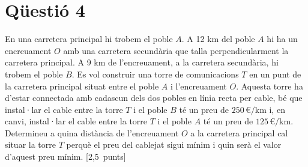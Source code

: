 \documentclass[11pt,a4paper]{article}
\begin{document}
\section*{\textcolor{blauPista}{Qüestió 4}}

\noindent En una carretera principal hi trobem el poble $A$. A 12 km del poble $A$ hi ha un encreuament $O$ amb una carretera secundària que talla perpendicularment la carretera principal. A 9 km de l'encreuament, a la carretera secundària, hi trobem el poble $B$. Es vol construir una torre de comunicacions $T$ en un punt de la carretera principal situat entre el poble $A$ i l'encreuament $O$. Aquesta torre ha d'estar connectada amb cadascun dels dos pobles en línia recta per cable, bé que instal·lar el cable entre la torre $T$ i el poble $B$ té un preu de $250\,\euro/\text{km}$ i, en canvi, instal·lar el cable entre la torre $T$ i el poble $A$ té un preu de $125\,\euro/\text{km}$. Determineu a quina distància de l'encreuament $O$ a la carretera principal cal situar la torre $T$ perquè el preu del cablejat sigui mínim i quin serà el valor d'aquest preu mínim. \hfill\textnormal{[2,5~punts]}

\end{document}
